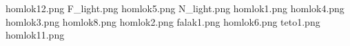 homlok12.png
F_light.png
homlok5.png
N_light.png
homlok1.png
homlok4.png
homlok3.png
homlok8.png
homlok2.png
falak1.png
homlok6.png
teto1.png
homlok11.png

